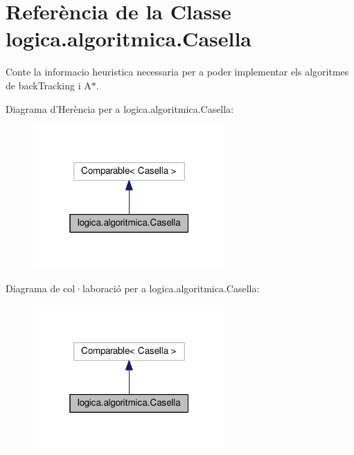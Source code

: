 \hypertarget{classlogica_1_1algoritmica_1_1_casella}{\section{Referència de la Classe logica.\+algoritmica.\+Casella}
\label{classlogica_1_1algoritmica_1_1_casella}
}


Conte la informacio heuristica necessaria per a poder implementar els algoritmes de back\+Tracking i A$\ast$.  




Diagrama d'Herència per a logica.\+algoritmica.\+Casella\+:\nopagebreak
\begin{figure}[H]
\begin{center}
\leavevmode
\includegraphics[width=208pt]{classlogica_1_1algoritmica_1_1_casella__inherit__graph}
\end{center}
\end{figure}


Diagrama de col·laboració per a logica.\+algoritmica.\+Casella\+:\nopagebreak
\begin{figure}[H]
\begin{center}
\leavevmode
\includegraphics[width=208pt]{classlogica_1_1algoritmica_1_1_casella__coll__graph}
\end{center}
\end{figure}
